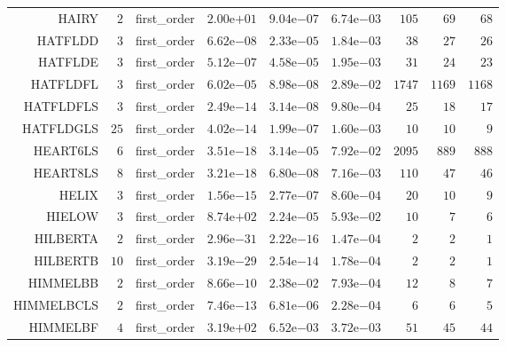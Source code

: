 \begin{longtable}{rrrrrrrrr}
HAIRY & \(     2\) & first\_order & \( 2.00\)e\(+01\) & \( 9.04\)e\(-07\) & \( 6.74\)e\(-03\) & \(   105\) & \(    69\) & \(    68\) \\
HATFLDD & \(     3\) & first\_order & \( 6.62\)e\(-08\) & \( 2.33\)e\(-05\) & \( 1.84\)e\(-03\) & \(    38\) & \(    27\) & \(    26\) \\
HATFLDE & \(     3\) & first\_order & \( 5.12\)e\(-07\) & \( 4.58\)e\(-05\) & \( 1.95\)e\(-03\) & \(    31\) & \(    24\) & \(    23\) \\
HATFLDFL & \(     3\) & first\_order & \( 6.02\)e\(-05\) & \( 8.98\)e\(-08\) & \( 2.89\)e\(-02\) & \(  1747\) & \(  1169\) & \(  1168\) \\
HATFLDFLS & \(     3\) & first\_order & \( 2.49\)e\(-14\) & \( 3.14\)e\(-08\) & \( 9.80\)e\(-04\) & \(    25\) & \(    18\) & \(    17\) \\
HATFLDGLS & \(    25\) & first\_order & \( 4.02\)e\(-14\) & \( 1.99\)e\(-07\) & \( 1.60\)e\(-03\) & \(    10\) & \(    10\) & \(     9\) \\
HEART6LS & \(     6\) & first\_order & \( 3.51\)e\(-18\) & \( 3.14\)e\(-05\) & \( 7.92\)e\(-02\) & \(  2095\) & \(   889\) & \(   888\) \\
HEART8LS & \(     8\) & first\_order & \( 3.21\)e\(-18\) & \( 6.80\)e\(-08\) & \( 7.16\)e\(-03\) & \(   110\) & \(    47\) & \(    46\) \\
HELIX & \(     3\) & first\_order & \( 1.56\)e\(-15\) & \( 2.77\)e\(-07\) & \( 8.60\)e\(-04\) & \(    20\) & \(    10\) & \(     9\) \\
HIELOW & \(     3\) & first\_order & \( 8.74\)e\(+02\) & \( 2.24\)e\(-05\) & \( 5.93\)e\(-02\) & \(    10\) & \(     7\) & \(     6\) \\
HILBERTA & \(     2\) & first\_order & \( 2.96\)e\(-31\) & \( 2.22\)e\(-16\) & \( 1.47\)e\(-04\) & \(     2\) & \(     2\) & \(     1\) \\
HILBERTB & \(    10\) & first\_order & \( 3.19\)e\(-29\) & \( 2.54\)e\(-14\) & \( 1.78\)e\(-04\) & \(     2\) & \(     2\) & \(     1\) \\
HIMMELBB & \(     2\) & first\_order & \( 8.66\)e\(-10\) & \( 2.38\)e\(-02\) & \( 7.93\)e\(-04\) & \(    12\) & \(     8\) & \(     7\) \\
HIMMELBCLS & \(     2\) & first\_order & \( 7.46\)e\(-13\) & \( 6.81\)e\(-06\) & \( 2.28\)e\(-04\) & \(     6\) & \(     6\) & \(     5\) \\
HIMMELBF & \(     4\) & first\_order & \( 3.19\)e\(+02\) & \( 6.52\)e\(-03\) & \( 3.72\)e\(-03\) & \(    51\) & \(    45\) & \(    44\) \\

\end{longtable}
